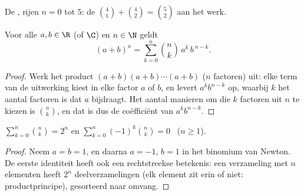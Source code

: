 \begin{omfigure}

{\small De , rijen $n = 0$ tot $5$: de 
$\binom{4}{1} + \binom{4}{2} = \binom{5}{2}$ aan het werk.}
\end{omfigure}

\begin{theorem}\label{thm:g12:comb:binomial}
Voor alle $a, b \in \R$ (of $\C$) en $n \in \N$ geldt
\[
(a+b)^n = \sum_{k=0}^{n} \binom{n}{k}\, a^{k}\, b^{\,n-k} .
\]
\end{theorem}

\begin{proof}
Werk het product $(a+b)(a+b)\cdots(a+b)$ ($n$ factoren) uit: elke term van de
uitwerking kiest in elke factor $a$ of $b$, en levert $a^k b^{n-k}$ op,
waarbij $k$ het aantal factoren is dat $a$ bijdraagt. Het aantal manieren om
die $k$ factoren uit $n$ te kiezen is $\binom nk$, en dat is dus de
coëfficiënt van $a^k b^{n-k}$.
\end{proof}

\begin{corollary}\label{cor:g12:comb:sums}
$\displaystyle\sum_{k=0}^{n} \binom{n}{k} = 2^n$
\quad en \quad
$\displaystyle\sum_{k=0}^{n} (-1)^k\binom{n}{k} = 0$ \ ($n \geq 1$).
\end{corollary}

\begin{proof}
Neem $a = b = 1$, en daarna $a = -1$, $b = 1$ in het binomium van Newton. De
eerste identiteit heeft ook een rechtstreekse betekenis: een verzameling met
$n$ elementen heeft $2^n$ deelverzamelingen (elk element zit erin of niet:
productprincipe), gesorteerd naar omvang.
\end{proof}

